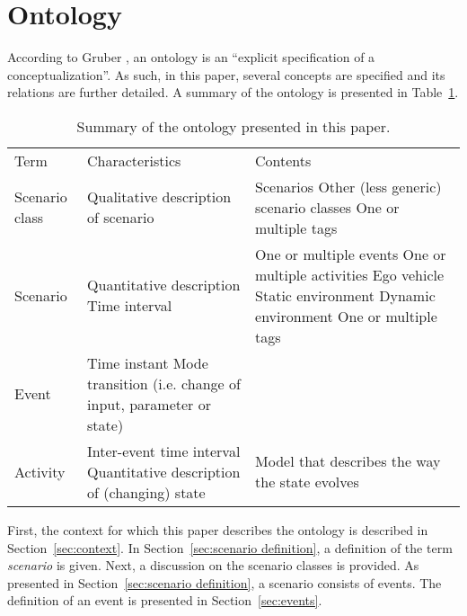 \section{Ontology}
\label{sec:ontology}

According to Gruber \cite{gruber1993ontology}, an ontology is an ``explicit specification of a conceptualization''. As such, in this paper, several concepts are specified and its relations are further detailed. A summary of the ontology is presented in Table~\ref{tab:ontology}.

\begin{table}
	\begin{center}
		\caption{Summary of the ontology presented in this paper.}
		\label{tab:ontology}
		\begin{tabularx}{\linewidth}{p{3em} X X}
			\toprule
			Term & Characteristics & Contents \\ \otoprule
			Scenario class & Qualitative description of scenario & Scenarios \newline Other (less generic) scenario classes \newline One or multiple tags \\
			Scenario & Quantitative description \newline Time interval & One or multiple events \newline One or multiple activities \newline Ego vehicle \newline Static environment \newline Dynamic environment \newline One or multiple tags \\
			Event & Time instant \newline Mode transition (i.e. change of input, parameter or state) & \\
			Activity & Inter-event time interval \newline Quantitative description of (changing) state & Model that describes the way the state evolves \\
			\bottomrule
		\end{tabularx}
	\end{center}
\end{table}

First, the context for which this paper describes the ontology is described in Section~\ref{sec:context}. In Section~\ref{sec:scenario definition}, a definition of the term \emph{scenario} is given. Next, a discussion on the scenario classes is provided. As presented in Section~\ref{sec:scenario definition}, a scenario consists of events. The definition of an event is presented in Section~\ref{sec:events}.





